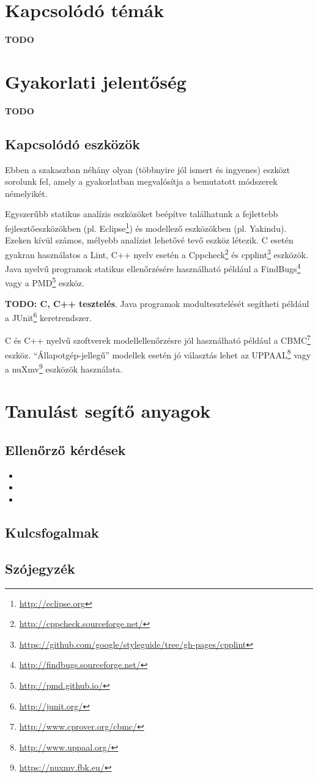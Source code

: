 \section*{Kapcsolódó témák}
\textbf{TODO}

\section*{Gyakorlati jelentőség}
\textbf{TODO}

\subsection*{Kapcsolódó eszközök}
Ebben a szakaszban néhány olyan (többnyire jól ismert és ingyenes) eszközt sorolunk fel, amely a gyakorlatban megvalósítja a bemutatott módszerek némelyikét.

Egyszerűbb statikus analízis eszközöket beépítve találhatunk a fejlettebb fejlesztőeszközökben (pl. Eclipse\footnote{\url{http://eclipse.org}}) és modellező eszközökben (pl. Yakindu). Ezeken kívül számos, mélyebb analízist lehetővé tevő eszköz létezik. C esetén gyakran használatos a Lint, C++ nyelv esetén a Cppcheck\footnote{\url{http://cppcheck.sourceforge.net/}} és cpplint\footnote{\url{https://github.com/google/styleguide/tree/gh-pages/cpplint}} eszközök. Java nyelvű programok statikus ellenőrzésére használható például a FindBugs\footnote{\url{http://findbugs.sourceforge.net/}} vagy a PMD\footnote{\url{http://pmd.github.io/}} eszköz.

\textbf{TODO: C, C++ tesztelés}. Java programok modultesztelését segítheti például a JUnit\footnote{\url{http://junit.org/}} keretrendszer.

C és C++ nyelvű szoftverek modellellenőrzésre jól használható például a CBMC\footnote{\url{http://www.cprover.org/cbmc/}} eszköz. ``Állapotgép-jellegű'' modellek esetén jó választás lehet az UPPAAL\footnote{\url{http://www.uppaal.org/}} vagy a nuXmv\footnote{\url{https://nuxmv.fbk.eu/}} eszközök használata.

\section*{Tanulást segítő anyagok}

\subsection*{Ellenőrző kérdések}
\begin{itemize}
	\item 
	\item
	\item
\end{itemize}

\subsection*{Kulcsfogalmak}

\subsection*{Szójegyzék}